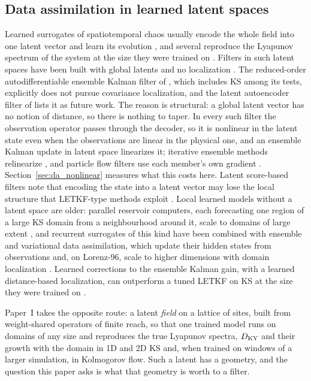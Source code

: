 \subsection{Data assimilation in learned latent spaces}
\label{sec:bg_latent}

Learned surrogates of spatiotemporal chaos usually encode the whole field
into one latent vector and learn its evolution
\citep{linotgraham2020,linotgraham2022,racca2023}, and several reproduce
the Lyapunov spectrum of the system at the size they were trained on
\citep{pathak2017,vlachas2020,ozalpmagri2025}. Filters in such latent
spaces have been built with global latents and no localization
\citep{peyron2021,chen2023roadenkf,pasmans2025,tong2026laeenkf}. The
reduced-order autodifferentiable ensemble Kalman filter of
\citet{chen2023roadenkf}, which includes KS among its tests, explicitly
does not pursue covariance localization, and the latent autoencoder
filter of \citet{tong2026laeenkf} lists it as future work. The reason is
structural: a global latent vector has no notion of distance, so there is
nothing to taper. In every such filter the observation operator passes
through the decoder, so it is nonlinear in the latent state even when the
observations are linear in the physical one, and an ensemble Kalman update
in latent space linearizes it; iterative ensemble methods relinearize
\citep{guoliver2007,sakov2012}, and particle flow filters use each member's
own gradient \citep{huvanleeuwen2021}. Section~\ref{sec:da_nonlinear}
measures what this costs here. Latent score-based filters note that encoding the state
into a latent vector may lose the local structure that LETKF-type methods
exploit \citep{si2025latentensf}. Local learned models without a latent space
are older: parallel reservoir computers, each forecasting one region of a large
KS domain from a neighbourhood around it, scale to domains of large extent
\citep{pathak2018prl}, and recurrent surrogates of this kind have been combined
with ensemble and variational data assimilation, which update their hidden
states from observations and, on Lorenz-96, scale to higher dimensions with
domain localization \citep{penny2022}. Learned corrections to the ensemble Kalman
gain, with a learned distance-based localization, can outperform a tuned
LETKF on KS at the size they were trained on \citep{bach2025}.

Paper~I \citep{jones2026transfer} takes the opposite route: a
latent \emph{field} on a lattice of sites, built from weight-shared
operators of finite reach, so that one trained model runs on domains of any
size and reproduces the true Lyapunov spectra, $D_{\mathrm{KY}}$ and their growth with
the domain in 1D and 2D KS and, when trained on windows of a larger simulation,
in Kolmogorov flow. Such a latent has a
geometry, and the question this paper asks is what that geometry is worth
to a filter.

